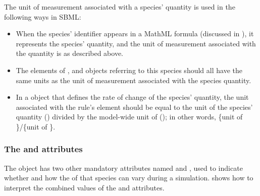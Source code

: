 The unit of measurement associated with a species' quantity is
used in the following ways in SBML:
\begin{itemize}

\item When the species' identifier appears in a MathML formula
  (discussed in ), it represents the
  species' quantity, and the unit of measurement associated with
  the quantity is as described above.

\item The  elements of \AssignmentRule,
  \InitialAssignment and \EventAssignment objects referring to
  this species should all have the same units as the unit of
  measurement associated with the species quantity.

\item In a \RateRule object that defines the rate of change of the
  species' quantity, the unit associated with the rule's
   element should be equal to the unit of the species'
  quantity () divided by the
  model-wide unit of 
  (); in other words, \{unit of
  \}/\{unit of \}.

\end{itemize}


\subsubsection{The  and  attributes}
\label{sec:species-constant}

The \Species object has two other mandatory  attributes
named  and , used to
indicate whether and how the  of that species can vary
during a simulation.   shows how to
interpret the combined values of the  and
 attributes.

